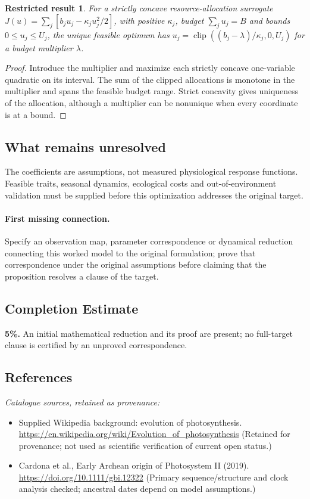 \documentclass[11pt]{article}
\newtheorem{attemptresult}{Restricted result}[section]
\begin{document}
\begin{attemptresult}
For a strictly concave resource-allocation surrogate $J(u)=\sum_j[b_ju_j-\kappa_j u_j^2/2]$, with positive $\kappa_j$, budget $\sum_ju_j=B$ and bounds $0\leq u_j\leq U_j$, the unique feasible optimum has $u_j=\operatorname{clip}((b_j-\lambda)/\kappa_j,0,U_j)$ for a budget multiplier $\lambda$.
\end{attemptresult}
\begin{proof}
Introduce the multiplier and maximize each strictly concave one-variable quadratic on its interval. The sum of the clipped allocations is monotone in the multiplier and spans the feasible budget range. Strict concavity gives uniqueness of the allocation, although a multiplier can be nonunique when every coordinate is at a bound.
\end{proof}
\subsection{What remains unresolved}
The coefficients are assumptions, not measured physiological response functions. Feasible traits, seasonal dynamics, ecological costs and out-of-environment validation must be supplied before this optimization addresses the original target.
\paragraph{First missing connection.} Specify an observation map, parameter correspondence or dynamical reduction connecting this worked model to the original formulation; prove that correspondence under the original assumptions before claiming that the proposition resolves a clause of the target.
\subsection{Completion Estimate}
\textbf{5\%.} An initial mathematical reduction and its proof are present; no full-target clause is certified by an unproved correspondence.
\subsection{References}
\noindent\emph{Catalogue sources, retained as provenance:}
\begin{itemize}
\item Supplied Wikipedia background: evolution of photosynthesis. \url{https://en.wikipedia.org/wiki/Evolution_of_photosynthesis} (Retained for provenance; not used as scientific verification of current open status.)
\item Cardona et al., Early Archean origin of Photosystem II (2019). \url{https://doi.org/10.1111/gbi.12322} (Primary sequence/structure and clock analysis checked; ancestral dates depend on model assumptions.)
\end{itemize}
\clearpage
\end{document}
